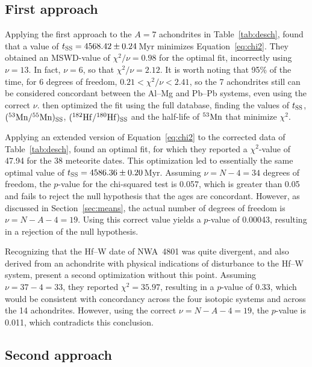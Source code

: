 \subsection{First approach}

Applying the first approach to the $A = 7$ achondrites in
Table~\ref{tab:desch}, \citet{desch2023a} found that a value of $\mbox{$t_{\rm SS}$} =
4568.42 \pm 0.24$\,Myr minimizes Equation~\ref{eq:chi2}.  They
obtained an MSWD-value of $\chi^2 / \nu = 0.98$ for the optimal fit,
incorrectly using $\nu = 13$.  In fact, $\nu = 6$, so that $\chi^2 /
\nu = 2.12$.  It is worth noting that 95\% of the time, for 6 degrees
of freedom, $0.21 < \chi^2 / \nu < 2.41$, so the 7 achondrites still
can be considered concordant between the Al--Mg and Pb--Pb systems,
even using the correct $\nu$. \citet{desch2023b} then optimized the
fit using the full database, finding the values of $\mbox{$t_{\rm SS}$}$,
$({}^{53}{\rm Mn}/{}^{55}{\rm Mn})_{\rm SS}$, $({}^{182}{\rm
  Hf}/{}^{180}{\rm Hf})_{\rm SS}$ and the half-life of ${}^{53}{\rm
  Mn}$ that minimize $\chi^2$.\medskip

Applying an extended version of Equation~\ref{eq:chi2} to the
corrected data of Table~\ref{tab:desch}, \citet{desch2023b} found an
optimal fit, for which they reported a $\chi^2$-value of 47.94 for the
38 meteorite dates. This optimization led to essentially the same
optimal value of $\mbox{$t_{\rm SS}$} = 4586.36 \pm 0.20$\,Myr. Assuming $\nu = N-4 =
34$ degrees of freedom, the $p$-value for the chi-squared test is
0.057, which is greater than 0.05 and fails to reject the null
hypothesis that the ages are concordant.  However, as discussed in
Section~\ref{sec:means}, the actual number of degrees of freedom is
$\nu = N-A-4 = 19$.  Using this correct value yields a $p$-value of
0.00043, resulting in a rejection of the null hypothesis.\medskip

Recognizing that the Hf--W date of NWA~4801 was quite divergent, and
also derived from an achondrite with physical indications of
disturbance to the Hf--W system, \citet{desch2023b} present a second
optimization without this point.  Assuming $\nu = 37-4 = 33$, they
reported $\chi^2 = 35.97$, resulting in a $p$-value of 0.33, which
would be consistent with concordancy across the four isotopic systems
and across the 14 achondrites.  However, using the correct $\nu =
N-A-4 = 19$, the $p$-value is 0.011, which contradicts this
conclusion.\medskip

\subsection{Second approach}

